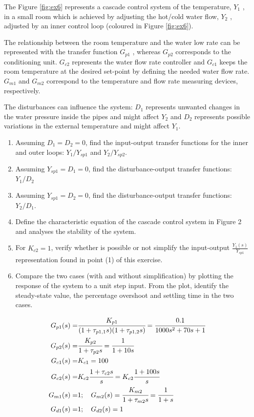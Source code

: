 \documentclass[a4paper]{article}
\begin{document}
The Figure \ref{fig:ex6} represents a cascade control system of the temperature, $Y_1$ , in a small room which
is achieved by adjusting the hot/cold water flow, $Y_2$ , adjusted by an inner control loop (coloured in Figure \ref{fig:ex6}). 

The relationship between the room temperature and the water low rate can be represented with the transfer function $G_{p1}$ , whereas $G_{p2}$ corresponds to the conditioning unit. $G_{c2}$ represents the water flow rate controller and $G_{c1}$ keeps the room temperature at the desired set-point by defining the needed water flow rate. $G_{m1}$ and $G_{m2}$ correspond to the temperature and flow rate measuring devices, respectively.

The disturbances can influence the system: $D_1$ represents unwanted changes in the water
pressure inside the pipes and might affect $Y_2$ and $D_2$ represents possible variations in the
external temperature and might affect $Y_1$.
\begin{enumerate}
    \item Assuming $D_1 = D_2 = 0$, find the input-output transfer functions for the inner and outer loops: $Y_1/Y_{sp1}$ and $Y_2/Y_{sp2}$.
    \item Assuming $Y_{sp1} = D_1 = 0$, find the disturbance-output transfer functions: $Y_1 /D_2$
    \item Assuming $Y_{sp1} = D_2 = 0$, find the disturbance-output transfer functions: $Y_2/D_1$.
    \item Define the characteristic equation of the cascade control system in Figure 2 and
analyses the stability of the system.
\item For $K_{c2} = 1$, verify whether is possible or not simplify the input-output $\frac{Y_1(s)}{Y_{sp1}}$
representation found in point (1) of this exercise.
\item Compare the two cases (with and without simplification) by plotting the response
of the system to a unit step input. From the plot, identify the steady-state value,
the percentage overshoot and settling time in the two cases.
\end{enumerate}

\begin{align*}
\begin{split}
G_{p1}(s)= & \cfrac{K_{p1}}{(1+\tau_{p1,1}s)(1+\tau_{p1,2}s)}=\cfrac{0.1}{1000s^2+70s+1}\\ 
G_{p2}(s)=& \cfrac{K_{p2}}{1+\tau_{p2}s}=\cfrac{1}{1+10s}\\ 
G_{c1}(s)=& K_{c1}=100  \\
G_{c2}(s)= & K_{c2}\cfrac{1+\tau_{c2}s}{s}=K_{c2}\cfrac{1+100s}{s} \\
G_{m1}(s)=&  1; \quad G_{m2}(s)= \cfrac{K_{m2}}{1+\tau_{m2}s}=\cfrac{1}{1+s}\\
G_{d1}(s)=&  1; \quad G_{d2}(s)= 1
\end{split}
\end{align*}
\end{document}
